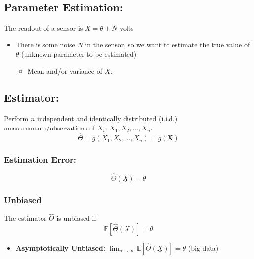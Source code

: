 \subsection{Parameter Estimation:}
\begin{motivation}
    The readout of a sensor is $X = \theta + N$ volts
    \begin{itemize}
        \item There is some noise $N$ in the sensor, so we want to estimate the true value of $\theta$ (unknown parameter to be estimated)
        \begin{itemize}
            \item Mean and/or variance of $X$. 
        \end{itemize}
    \end{itemize}
\end{motivation}

\subsection{Estimator:}
\begin{definition}
    Perform $n$ independent and identically distributed (i.i.d.) measurements/observations of $X_i$: $X_1, X_2, \ldots, X_n$.
    \begin{equation}
        \hat{\Theta} = g(X_1, X_2, \ldots, X_n) = g(\mathbf{X})
    \end{equation}
\end{definition}

\subsubsection{Estimation Error:}
\begin{definition}
    \begin{equation}
        \hat{\Theta}(\underline{X}) - \theta
    \end{equation}
\end{definition}

\subsubsection{Unbiased}
\begin{definition}
    The estimator $\hat{\Theta}$ is unbiased if 
    \begin{equation}
        \mathbb{E}[\hat{\Theta}(\underline{X})] = \theta
    \end{equation}
    \begin{itemize}
        \item \textbf{Asymptotically Unbiased:} $\lim_{n \to \infty} \mathbb{E}[\hat{\Theta}(\underline{X})] = \theta$ (big data)
    \end{itemize}
\end{definition}

